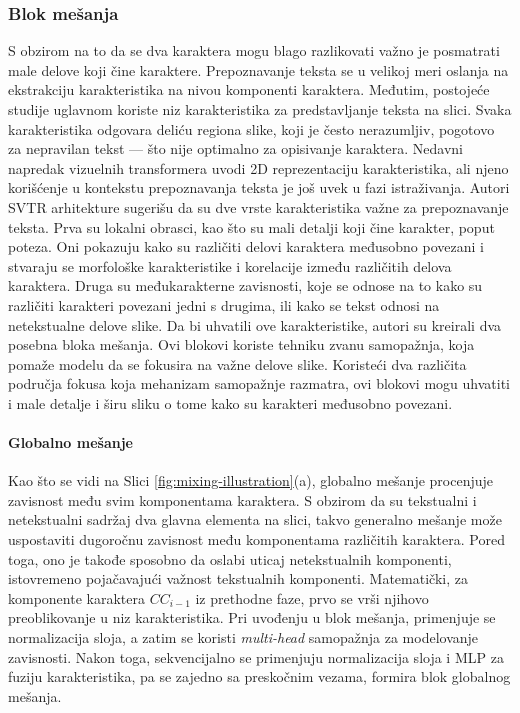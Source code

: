 \documentclass[a4paper,12pt]{article}
\begin{document}
	\subsubsection{Blok mešanja}
	S obzirom na to da se dva karaktera mogu blago razlikovati važno je posmatrati male delove koji čine karaktere. Prepoznavanje teksta se u velikoj meri oslanja na ekstrakciju karakteristika na nivou komponenti karaktera. Međutim, postojeće studije uglavnom koriste niz karakteristika za predstavljanje teksta na slici. Svaka karakteristika odgovara deliću regiona slike, koji je često nerazumljiv, pogotovo za nepravilan tekst — što nije optimalno za opisivanje karaktera. Nedavni napredak vizuelnih transformera uvodi 2D reprezentaciju karakteristika, ali njeno korišćenje u kontekstu prepoznavanja teksta je još uvek u fazi istraživanja. Autori SVTR arhitekture sugerišu da su dve vrste karakteristika važne za prepoznavanje teksta. Prva su lokalni obrasci, kao što su mali detalji koji čine karakter, poput poteza. Oni pokazuju kako su različiti delovi karaktera međusobno povezani i stvaraju se morfološke karakteristike i korelacije između različitih delova karaktera. Druga su međukarakterne zavisnosti, koje se odnose na to kako su različiti karakteri povezani jedni s drugima, ili kako se tekst odnosi na netekstualne delove slike. Da bi uhvatili ove karakteristike, autori su kreirali dva posebna bloka mešanja. Ovi blokovi koriste tehniku zvanu samopažnja, koja pomaže modelu da se fokusira na važne delove slike. Koristeći dva različita područja fokusa koja mehanizam samopažnje razmatra, ovi blokovi mogu uhvatiti i male detalje i širu sliku o tome kako su karakteri međusobno povezani.
	
	\paragraph{Globalno mešanje}
	Kao što se vidi na Slici \ref{fig:mixing-illustration}(a), globalno mešanje procenjuje zavisnost među svim komponentama karaktera. S obzirom da su tekstualni i netekstualni sadržaj dva glavna elementa na slici, takvo generalno mešanje može uspostaviti dugoročnu zavisnost među komponentama različitih karaktera. Pored toga, ono je takođe sposobno da oslabi uticaj netekstualnih komponenti, istovremeno pojačavajući važnost tekstualnih komponenti. Matematički, za komponente karaktera \(CC_{i-1}\) iz prethodne faze, prvo se vrši njihovo preoblikovanje u niz karakteristika. Pri uvođenju u blok mešanja, primenjuje se normalizacija sloja, a zatim se koristi \textit{multi-head} samopažnja za modelovanje zavisnosti. Nakon toga, sekvencijalno se primenjuju normalizacija sloja i MLP za fuziju karakteristika, pa se zajedno sa preskočnim vezama, formira blok globalnog mešanja.
	
\end{document}
